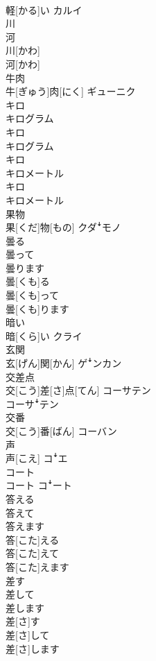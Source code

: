 \documentclass[8pt]{extreport}
\begin{document}
\begin{CJK}{UTF8}{min}
\\	軽[かる]い	カルイ
\\	川 
\\	河	
\\	川[かわ] 
\\	河[かわ]	
\\	牛肉	
\\	牛[ぎゅう]肉[にく]	ギューニク
\\	キロ 
\\	キログラム	
\\	キロ 
\\	キログラム	
\\	キロ 
\\	キロメートル	
\\	キロ 
\\	キロメートル	
\\	果物	
\\	果[くだ]物[もの]	クダꜜモノ
\\	曇る 
\\	曇って 
\\	曇ります	
\\	曇[くも]る 
\\	曇[くも]って 
\\	曇[くも]ります	
\\	暗い	
\\	暗[くら]い	クライ
\\	玄関	
\\	玄[げん]関[かん]	ゲꜜンカン
\\	交差点	
\\	交[こう]差[さ]点[てん]	コーサテン 
\\	コーサꜜテン
\\	交番	
\\	交[こう]番[ばん]	コーバン
\\	声	
\\	声[こえ]	コꜜエ
\\	コート	
\\	コート	コꜜート
\\	答える 
\\	答えて 
\\	答えます	
\\	答[こた]える 
\\	答[こた]えて 
\\	答[こた]えます	
\\	差す 
\\	差して 
\\	差します	
\\	差[さ]す 
\\	差[さ]して 
\\	差[さ]します 

\end{CJK}
\end{document}

